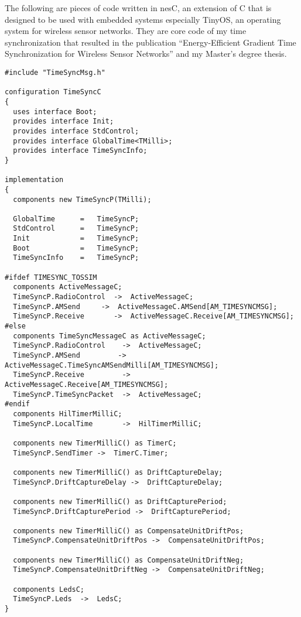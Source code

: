 \documentclass[a4paper,10pt]{report}
\begin{document}
The following are pieces of code written in nesC, an extension of C that is designed to be used with embedded systems especially TinyOS, an operating system for wireless sensor networks. They are core code of my time synchronization that resulted in the publication ``Energy-Efficient Gradient Time Synchronization for Wireless Sensor Networks'' and my Master's degree thesis. 
\vspace{0.2cm}
\begin{lstlisting}
#include "TimeSyncMsg.h"

configuration TimeSyncC
{
  uses interface Boot;
  provides interface Init;
  provides interface StdControl;
  provides interface GlobalTime<TMilli>;
  provides interface TimeSyncInfo;
}

implementation
{
  components new TimeSyncP(TMilli);

  GlobalTime      =   TimeSyncP;
  StdControl      =   TimeSyncP;
  Init            =   TimeSyncP;
  Boot            =   TimeSyncP;
  TimeSyncInfo    =   TimeSyncP;

#ifdef TIMESYNC_TOSSIM
  components ActiveMessageC;
  TimeSyncP.RadioControl  ->  ActiveMessageC;
  TimeSyncP.AMSend     ->  ActiveMessageC.AMSend[AM_TIMESYNCMSG];
  TimeSyncP.Receive       ->  ActiveMessageC.Receive[AM_TIMESYNCMSG];
#else
  components TimeSyncMessageC as ActiveMessageC;
  TimeSyncP.RadioControl    ->  ActiveMessageC;
  TimeSyncP.AMSend         ->  ActiveMessageC.TimeSyncAMSendMilli[AM_TIMESYNCMSG];
  TimeSyncP.Receive         ->  ActiveMessageC.Receive[AM_TIMESYNCMSG];
  TimeSyncP.TimeSyncPacket  ->  ActiveMessageC;
#endif
  components HilTimerMilliC;
  TimeSyncP.LocalTime       ->  HilTimerMilliC;

  components new TimerMilliC() as TimerC;
  TimeSyncP.SendTimer ->  TimerC.Timer;

  components new TimerMilliC() as DriftCaptureDelay;
  TimeSyncP.DriftCaptureDelay ->  DriftCaptureDelay;

  components new TimerMilliC() as DriftCapturePeriod;
  TimeSyncP.DriftCapturePeriod ->  DriftCapturePeriod;

  components new TimerMilliC() as CompensateUnitDriftPos;
  TimeSyncP.CompensateUnitDriftPos ->  CompensateUnitDriftPos;
  
  components new TimerMilliC() as CompensateUnitDriftNeg;
  TimeSyncP.CompensateUnitDriftNeg ->  CompensateUnitDriftNeg;

  components LedsC;
  TimeSyncP.Leds  ->  LedsC;
}
\end{lstlisting}
\end{document}

